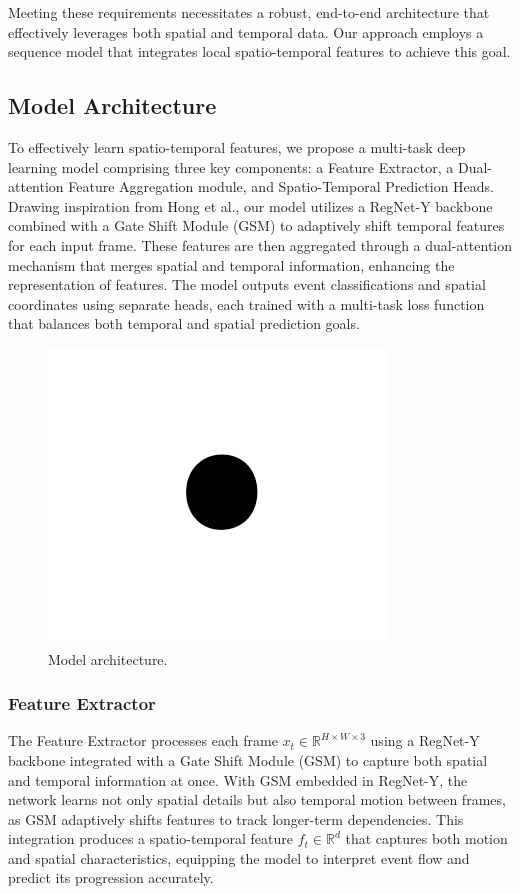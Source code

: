 \documentclass[conference]{IEEEtran}
\begin{document}
Meeting these requirements necessitates a robust, end-to-end architecture that effectively leverages both spatial and temporal data. Our approach employs a sequence model that integrates local spatio-temporal features to achieve this goal.


\subsection{Model Architecture}
To effectively learn spatio-temporal features, we propose a multi-task deep learning model comprising three key components: a Feature Extractor, a Dual-attention Feature Aggregation module, and Spatio-Temporal Prediction Heads. Drawing inspiration from Hong et al.\cite{spot22}, our model utilizes a RegNet-Y backbone \cite{radosavovic2020designingnetworkdesignspaces} combined with a Gate Shift Module (GSM) \cite{9156729} to adaptively shift temporal features for each input frame. These features are then aggregated through a dual-attention mechanism that merges spatial and temporal information, enhancing the representation of features. The model outputs event classifications and spatial coordinates using separate heads, each trained with a multi-task loss function that balances both temporal and spatial prediction goals.


\begin{figure}[htbp]
    \centerline{\includegraphics{fig1.png}}
    \caption{Model architecture.}
    \label{fig}
\end{figure}

\subsubsection{Feature Extractor}
The Feature Extractor processes each frame \( x_t \in \mathbb{R}^{H \times W \times 3} \) using a RegNet-Y backbone integrated with a Gate Shift Module (GSM) to capture both spatial and temporal information at once. With GSM embedded in RegNet-Y, the network learns not only spatial details but also temporal motion between frames, as GSM adaptively shifts features to track longer-term dependencies. This integration produces a spatio-temporal feature \( f_t \in \mathbb{R}^d \) that captures both motion and spatial characteristics, equipping the model to interpret event flow and predict its progression accurately.
\end{document}
